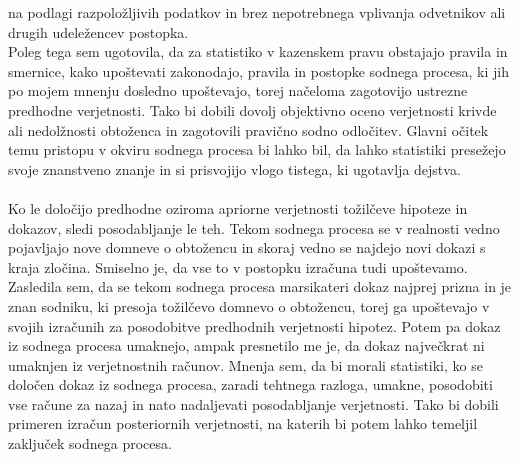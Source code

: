\documentclass[fin1, tisk]{fmfdelo}
\theoremstyle{definition}
\theoremstyle{trditev}
\theoremstyle{izrek}
\begin{document}
na podlagi razpoložljivih podatkov in brez nepotrebnega vplivanja odvetnikov ali drugih udeležencev postopka. \\
Poleg tega sem ugotovila, da za statistiko v kazenskem pravu obstajajo pravila in smernice, kako upoštevati zakonodajo, pravila in postopke 
sodnega procesa, ki jih po mojem mnenju dosledno upoštevajo, torej načeloma zagotovijo ustrezne predhodne verjetnosti. Tako bi dobili dovolj 
objektivno oceno verjetnosti krivde ali nedolžnosti obtoženca in zagotovili pravično sodno odločitev. Glavni očitek temu pristopu v okviru 
sodnega procesa bi lahko bil, da lahko statistiki presežejo svoje znanstveno znanje in si prisvojijo vlogo tistega, ki ugotavlja dejstva.\\\\
Ko le določijo predhodne oziroma apriorne verjetnosti tožilčeve hipoteze in dokazov, sledi posodabljanje le teh. Tekom sodnega 
procesa se v realnosti vedno pojavljajo nove domneve o obtožencu in skoraj vedno se najdejo novi dokazi s kraja zločina. Smiselno je, da vse to v postopku 
izračuna tudi upoštevamo. Zasledila sem, da se tekom sodnega procesa marsikateri dokaz najprej prizna in je znan sodniku, ki presoja tožilčevo domnevo 
o obtožencu, torej ga upoštevajo v svojih izračunih za posodobitve predhodnih verjetnosti hipotez. Potem pa dokaz iz sodnega procesa umaknejo, ampak 
presnetilo me je, da dokaz največkrat ni umaknjen iz verjetnostnih računov. Mnenja sem, da bi morali statistiki, ko se določen dokaz iz 
sodnega procesa, zaradi tehtnega razloga, umakne, posodobiti vse račune za nazaj in nato nadaljevati posodabljanje verjetnosti. Tako bi dobili primeren 
izračun posteriornih verjetnosti, na katerih bi potem lahko temeljil zaključek sodnega procesa.

\end{document}
